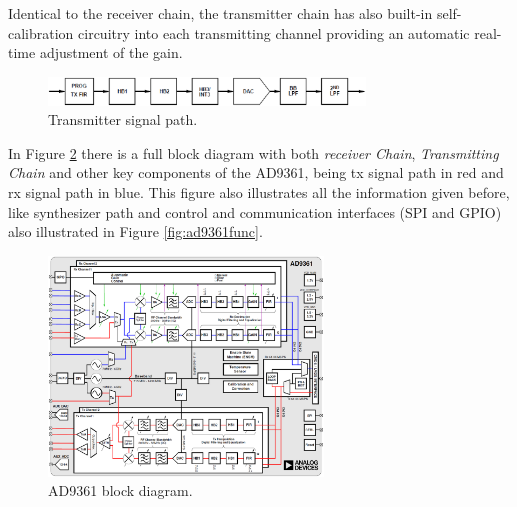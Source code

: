 Identical to the receiver chain, the transmitter chain has also built-in
self-calibration circuitry into each transmitting channel providing an automatic
real-time adjustment of the gain.

\begin{figure}[htbp]
    \centering
    \includegraphics[width=0.75\textwidth]{./figures/tx_chain}
    \caption{ Transmitter signal path.
    \label{fig:txchain}}
\end{figure}


%

In Figure \ref{fig:ad9361blk} there is a full block diagram with both
\textit{receiver Chain}, \textit{Transmitting Chain} and other key components of
the AD9361, being tx signal path in red and rx signal path in blue. This figure
also illustrates all the information given before, like synthesizer path and
control and communication interfaces (SPI and GPIO) also illustrated in Figure
\ref{fig:ad9361func}.

\begin{figure}[htbp]
    \centering
    \includegraphics[width=0.65\textwidth]{./figures/ad9361_block_diagram}
    \caption{ AD9361 block diagram.
    \label{fig:ad9361blk}}
\end{figure}


